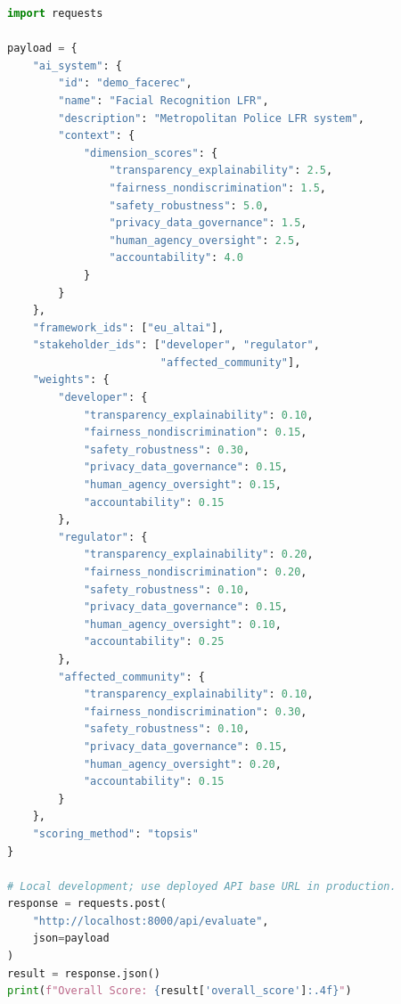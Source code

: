 \setcounter{lstlisting}{2}
\begin{lstlisting}[language=Python, caption={Example API call to the evaluate endpoint.}]
import requests

payload = {
    "ai_system": {
        "id": "demo_facerec",
        "name": "Facial Recognition LFR",
        "description": "Metropolitan Police LFR system",
        "context": {
            "dimension_scores": {
                "transparency_explainability": 2.5,
                "fairness_nondiscrimination": 1.5,
                "safety_robustness": 5.0,
                "privacy_data_governance": 1.5,
                "human_agency_oversight": 2.5,
                "accountability": 4.0
            }
        }
    },
    "framework_ids": ["eu_altai"],
    "stakeholder_ids": ["developer", "regulator",
                        "affected_community"],
    "weights": {
        "developer": {
            "transparency_explainability": 0.10,
            "fairness_nondiscrimination": 0.15,
            "safety_robustness": 0.30,
            "privacy_data_governance": 0.15,
            "human_agency_oversight": 0.15,
            "accountability": 0.15
        },
        "regulator": {
            "transparency_explainability": 0.20,
            "fairness_nondiscrimination": 0.20,
            "safety_robustness": 0.10,
            "privacy_data_governance": 0.15,
            "human_agency_oversight": 0.10,
            "accountability": 0.25
        },
        "affected_community": {
            "transparency_explainability": 0.10,
            "fairness_nondiscrimination": 0.30,
            "safety_robustness": 0.10,
            "privacy_data_governance": 0.15,
            "human_agency_oversight": 0.20,
            "accountability": 0.15
        }
    },
    "scoring_method": "topsis"
}

# Local development; use deployed API base URL in production.
response = requests.post(
    "http://localhost:8000/api/evaluate",
    json=payload
)
result = response.json()
print(f"Overall Score: {result['overall_score']:.4f}")
\end{lstlisting}
